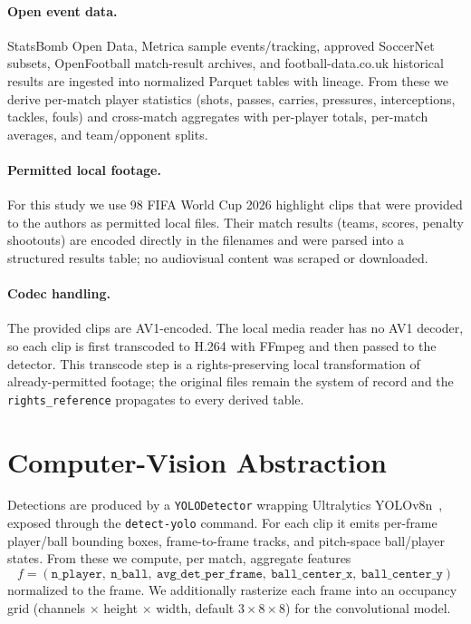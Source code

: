 \documentclass[11pt]{article}
\begin{document}
\paragraph{Open event data.} StatsBomb Open Data, Metrica sample events/tracking,
approved SoccerNet subsets, OpenFootball match-result archives, and
football-data.co.uk historical results are ingested into normalized Parquet
tables with lineage. From these we derive per-match player statistics (shots,
passes, carries, pressures, interceptions, tackles, fouls) and cross-match
aggregates with per-player totals, per-match averages, and team/opponent splits.

\paragraph{Permitted local footage.} For this study we use 98 FIFA World Cup 2026
highlight clips that were provided to the authors as permitted local files.
Their match results (teams, scores, penalty shootouts) are encoded directly in
the filenames and were parsed into a structured results table; no audiovisual
content was scraped or downloaded.

\paragraph{Codec handling.} The provided clips are AV1-encoded. The local media
reader has no AV1 decoder, so each clip is first transcoded to H.264 with
FFmpeg and then passed to the detector. This transcode step is a
rights-preserving local transformation of already-permitted footage; the
original files remain the system of record and the \texttt{rights\_reference}
propagates to every derived table.

\section{Computer-Vision Abstraction}
Detections are produced by a \texttt{YOLODetector} wrapping Ultralytics
YOLOv8n~\cite{ultralytics}, exposed through the \texttt{detect-yolo} command.
For each clip it emits per-frame player/ball bounding boxes, frame-to-frame
tracks, and pitch-space ball/player states. From these we compute, per match,
aggregate features
\[
f = (\texttt{n\_player},\ \texttt{n\_ball},\ \texttt{avg\_det\_per\_frame},\
\texttt{ball\_center\_x},\ \texttt{ball\_center\_y})
\]
normalized to the frame. We additionally rasterize each frame into an
occupancy grid (channels $\times$ height $\times$ width, default
$3\times 8\times 8$) for the convolutional model.
\end{document}

